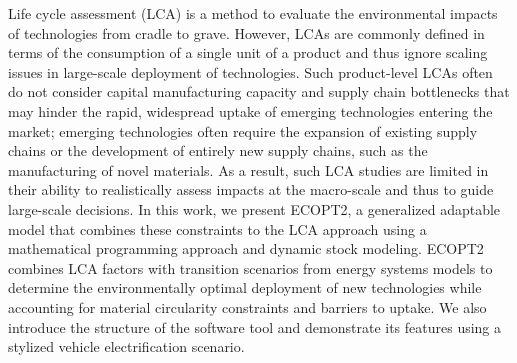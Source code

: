 Life cycle assessment (LCA) is a method to evaluate the environmental impacts of technologies from cradle to grave. However, LCAs are commonly defined in terms of the consumption of a single unit of a product and thus ignore scaling issues in large-scale deployment of technologies. Such product-level LCAs often do not consider capital manufacturing capacity and supply chain bottlenecks that may hinder the rapid, widespread uptake of emerging technologies entering the market; emerging technologies often require the expansion of existing supply chains or the development of entirely new supply chains, such as the manufacturing of novel materials. As a result, such LCA studies are limited in their ability to realistically assess impacts at the macro-scale and thus to guide large-scale decisions. In this work, we present ECOPT2, a generalized adaptable model that combines these constraints to the LCA approach using a mathematical programming approach and dynamic stock modeling. ECOPT2 combines LCA factors with transition scenarios from energy systems models to determine the environmentally optimal deployment of new technologies while accounting for material circularity constraints and barriers to uptake. We also introduce the structure of the software tool and demonstrate its features using a stylized vehicle electrification scenario.

